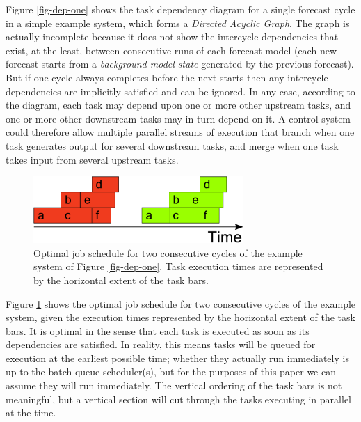 \documentclass[11pt,a4paper]{article}
\begin{document}
Figure \ref{fig-dep-one} shows the task dependency diagram for a single
forecast cycle in a simple example system, which forms a {\em Directed
Acyclic Graph}. The graph is actually incomplete because it does not
show the intercycle dependencies that exist, at the least, between
consecutive runs of each forecast model (each new forecast starts from a
{\em background model state} generated by the previous forecast). But
if one cycle always completes before the next starts then any intercycle
dependencies are implicitly satisfied and can be ignored. In any
case, according to the diagram, each task may depend upon one or more
other upstream tasks, and one or more other downstream tasks may in turn
depend on it. A control system could therefore allow multiple parallel
streams of execution that branch when one task generates output for
several downstream tasks, and merge when one task takes input from
several upstream tasks. 
\begin{figure}
    \begin{center}
        \includegraphics[width=8cm]{timeline-one}
    \end{center}
    \caption{\small Optimal job schedule for two consecutive cycles of
    the example system of Figure \ref{fig-dep-one}. Task execution
    times are represented by the horizontal extent of the task bars.}
    \label{fig-time-one}
\end{figure}
Figure \ref{fig-time-one} shows the optimal job schedule for two
consecutive cycles of the example system, given the execution times
represented by the horizontal extent of the task bars.  It is optimal in
the sense that each task is executed as soon as its dependencies are
satisfied. In reality, this means tasks will be queued for execution at
the earliest possible time; whether they actually run immediately is up
to the batch queue scheduler(s), but for the purposes of this paper we
can assume they will run immediately.  The vertical ordering of the task
bars is not meaningful, but a vertical section will cut through the
tasks executing in parallel at the time.
\end{document}
